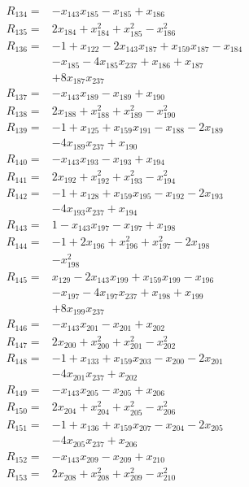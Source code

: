 \begin{align*}
R_{134}={}&-x_{143}x_{185} -x_{185} +x_{186}\\[3pt]
R_{135}={}&2x_{184} +x_{184}^{2} +x_{185}^{2} -x_{186}^{2}\\[3pt]
R_{136}={}&-1 +x_{122} -2x_{143}x_{187} +x_{159}x_{187} -x_{184}\\
&-x_{185} -4x_{185}x_{237} +x_{186} +x_{187}\\
&+8x_{187}x_{237}\\[3pt]
R_{137}={}&-x_{143}x_{189} -x_{189} +x_{190}\\[3pt]
R_{138}={}&2x_{188} +x_{188}^{2} +x_{189}^{2} -x_{190}^{2}\\[3pt]
R_{139}={}&-1 +x_{125} +x_{159}x_{191} -x_{188} -2x_{189}\\
&-4x_{189}x_{237} +x_{190}\\[3pt]
R_{140}={}&-x_{143}x_{193} -x_{193} +x_{194}\\[3pt]
R_{141}={}&2x_{192} +x_{192}^{2} +x_{193}^{2} -x_{194}^{2}\\[3pt]
R_{142}={}&-1 +x_{128} +x_{159}x_{195} -x_{192} -2x_{193}\\
&-4x_{193}x_{237} +x_{194}\\[3pt]
R_{143}={}&1 -x_{143}x_{197} -x_{197} +x_{198}\\[3pt]
R_{144}={}&-1 +2x_{196} +x_{196}^{2} +x_{197}^{2} -2x_{198}\\
&-x_{198}^{2}\\[3pt]
R_{145}={}&x_{129} -2x_{143}x_{199} +x_{159}x_{199} -x_{196}\\
&-x_{197} -4x_{197}x_{237} +x_{198} +x_{199}\\
&+8x_{199}x_{237}\\[3pt]
R_{146}={}&-x_{143}x_{201} -x_{201} +x_{202}\\[3pt]
R_{147}={}&2x_{200} +x_{200}^{2} +x_{201}^{2} -x_{202}^{2}\\[3pt]
R_{148}={}&-1 +x_{133} +x_{159}x_{203} -x_{200} -2x_{201}\\
&-4x_{201}x_{237} +x_{202}\\[3pt]
R_{149}={}&-x_{143}x_{205} -x_{205} +x_{206}\\[3pt]
R_{150}={}&2x_{204} +x_{204}^{2} +x_{205}^{2} -x_{206}^{2}\\[3pt]
R_{151}={}&-1 +x_{136} +x_{159}x_{207} -x_{204} -2x_{205}\\
&-4x_{205}x_{237} +x_{206}\\[3pt]
R_{152}={}&-x_{143}x_{209} -x_{209} +x_{210}\\[3pt]
R_{153}={}&2x_{208} +x_{208}^{2} +x_{209}^{2} -x_{210}^{2}\\[3pt]

\end{align*}
